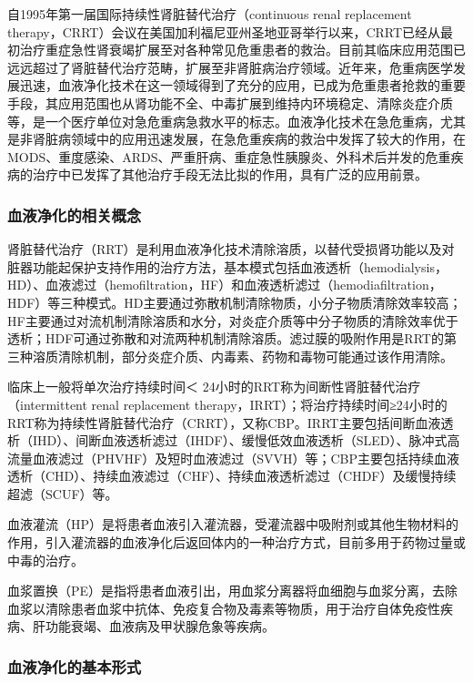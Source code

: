 自1995年第一届国际持续性肾脏替代治疗（continuous renal replacement
therapy，CRRT）会议在美国加利福尼亚州圣地亚哥举行以来，CRRT已经从最初治疗重症急性肾衰竭扩展至对各种常见危重患者的救治。目前其临床应用范围已远远超过了肾脏替代治疗范畴，扩展至非肾脏病治疗领域。近年来，危重病医学发展迅速，血液净化技术在这一领域得到了充分的应用，已成为危重患者抢救的重要手段，其应用范围也从肾功能不全、中毒扩展到维持内环境稳定、清除炎症介质等，是一个医疗单位对急危重病急救水平的标志。血液净化技术在急危重病，尤其是非肾脏病领域中的应用迅速发展，在急危重疾病的救治中发挥了较大的作用，在MODS、重度感染、ARDS、严重肝病、重症急性胰腺炎、外科术后并发的危重疾病的治疗中已发挥了其他治疗手段无法比拟的作用，具有广泛的应用前景。

\subsubsection{血液净化的相关概念}

肾脏替代治疗（RRT）是利用血液净化技术清除溶质，以替代受损肾功能以及对脏器功能起保护支持作用的治疗方法，基本模式包括血液透析（hemodialysis，HD）、血液滤过（hemofiltration，HF）和血液透析滤过（hemodiafiltration，HDF）等三种模式。HD主要通过弥散机制清除物质，小分子物质清除效率较高；HF主要通过对流机制清除溶质和水分，对炎症介质等中分子物质的清除效率优于透析；HDF可通过弥散和对流两种机制清除溶质。滤过膜的吸附作用是RRT的第三种溶质清除机制，部分炎症介质、内毒素、药物和毒物可能通过该作用清除。

临床上一般将单次治疗持续时间＜
24小时的RRT称为间断性肾脏替代治疗（intermittent renal replacement
therapy，IRRT）；将治疗持续时间≥24小时的RRT称为持续性肾脏替代治疗（CRRT），又称CBP。IRRT主要包括间断血液透析（IHD）、间断血液透析滤过（IHDF）、缓慢低效血液透析（SLED）、脉冲式高流量血液滤过（PHVHF）及短时血液滤过（SVVH）等；CBP主要包括持续血液透析（CHD）、持续血液滤过（CHF）、持续血液透析滤过（CHDF）及缓慢持续超滤（SCUF）等。

血液灌流（HP）是将患者血液引入灌流器，受灌流器中吸附剂或其他生物材料的作用，引入灌流器的血液净化后返回体内的一种治疗方式，目前多用于药物过量或中毒的治疗。

血浆置换（PE）是指将患者血液引出，用血浆分离器将血细胞与血浆分离，去除血浆以清除患者血浆中抗体、免疫复合物及毒素等物质，用于治疗自体免疫性疾病、肝功能衰竭、血液病及甲状腺危象等疾病。

\subsubsection{血液净化的基本形式}

